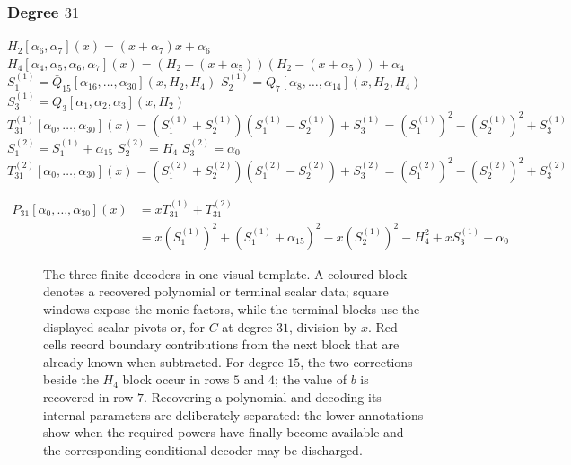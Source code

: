 \subsubsection{Degree \texorpdfstring{$31$}{31}}
\begin{algorithm}[H]
    \caption{
        Fifteen-product compatible joint realization in degree $31$.
    }

    \begin{algorithmic}
        \State $H_2[\alpha_6, \alpha_7](x) = (x + \alpha_7)x + \alpha_6$
        \State $H_4[\alpha_4, \alpha_5, \alpha_6, \alpha_7](x) = (H_2 + (x + \alpha_5))(H_2 - (x + \alpha_5)) + \alpha_4$
        \\
        \State $S^{(1)}_1 = \bar Q_{15}[\alpha_{16}, \ldots, \alpha_{30}](x, H_2, H_4)$
        \State $S^{(1)}_2 = Q_7[\alpha_8, \ldots, \alpha_{14}](x, H_2, H_4)$
        \State $S^{(1)}_3 = Q_3[\alpha_1, \alpha_2, \alpha_3](x, H_2)$
        \State $T^{(1)}_{31}[\alpha_0, \ldots, \alpha_{30}](x)
            = (S^{(1)}_1 + S^{(1)}_2)(S^{(1)}_1 - S^{(1)}_2) + S^{(1)}_3
            = (S^{(1)}_1)^2 - (S^{(1)}_2)^2 + S^{(1)}_3$
        \\
        \State $S^{(2)}_1 = S^{(1)}_1 + \alpha_{15}$
        \State $S^{(2)}_2 = H_4$
        \State $S^{(2)}_3 = \alpha_0$
        \State $T^{(2)}_{31}[\alpha_0, \ldots, \alpha_{30}](x)
            = (S^{(2)}_1 + S^{(2)}_2)(S^{(2)}_1 - S^{(2)}_2) + S^{(2)}_3
            = (S^{(2)}_1)^2 - (S^{(2)}_2)^2 + S^{(2)}_3$

        \State \begin{align}
            P_{31}[\alpha_0, \ldots, \alpha_{30}](x)
            &= x T^{(1)}_{31} + T^{(2)}_{31}
            \\&= x(S^{(1)}_1)^2 + (S^{(1)}_1 + \alpha_{15})^2 - x(S^{(1)}_2)^2 - H_4^2 + x S^{(1)}_3 + \alpha_0
        \end{align}
    \end{algorithmic}
\end{algorithm}

\begin{figure}[H]
  \centering
  \resizebox{\textwidth}{!}{}
  \caption{The three finite decoders in one visual template.  A coloured
  block denotes a recovered polynomial or terminal scalar data; square
  windows expose the monic factors, while the terminal blocks use the
  displayed scalar pivots or, for $C$ at degree $31$, division by $x$.
  Red cells record boundary contributions from the next block that are
  already known when subtracted.  For degree $15$, the two corrections
  beside the $H_4$ block occur in rows $5$ and $4$; the value of $b$ is
  recovered in row $7$.  Recovering a polynomial and decoding its internal parameters
  are deliberately separated: the lower annotations show when the required
  powers have finally become available and the corresponding conditional
  decoder may be discharged.}
  \label{fig:special-case-decoders}
\end{figure}

